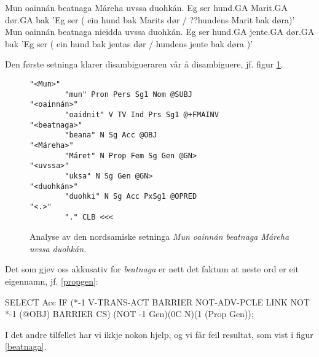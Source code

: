 \documentclass[a4paper,nynorsk]{article}
\begin{document}
\begin{example}\label{hund}
\gll Mun oainnán beatnaga Máreha uvssa duohkán.
 Eg ser hund.GA Marit.GA dør.GA bak
\glt 'Eg ser ( ein hund bak Marits dør / ??hundens Marit bak døra)'
\glend
\gll Mun oainnán beatnaga nieidda uvssa duohkán.
  Eg ser hund.GA jente.GA dør.GA bak
\glt 'Eg ser ( ein hund bak jentas dør / hundens jente bak døra )'
\glend
\end{example}

Den første setninga klarer disambigueraren vår å disambiguere, jf. figur \ref{Mareha}. %

\begin{figure}[htbp]
\begin{center}
\begin{verbatim}
"<Mun>"
        "mun" Pron Pers Sg1 Nom @SUBJ
"<oainnán>"
        "oaidnit" V TV Ind Prs Sg1 @+FMAINV
"<beatnaga>"
        "beana" N Sg Acc @OBJ
"<Máreha>"
        "Máret" N Prop Fem Sg Gen @GN>
"<uvssa>"
        "uksa" N Sg Gen @GN>
"<duohkán>"
        "duohki" N Sg Acc PxSg1 @OPRED
"<.>"
        "." CLB <<<
\end{verbatim}
\caption{Analyse av den nordsamiske setninga \textit{Mun oainnán beatnaga Máreha uvssa duohkán.}}
\label{Mareha}
\end{center}
\end{figure}


Det som gjev oss akkusativ for \textit{beatnaga} er nett det faktum at neste ord er eit eigennamn, jf. \ref{propgen}: %

\begin{example}\label{propgen}
SELECT Acc IF (*-1 V-TRANS-ACT BARRIER NOT-ADV-PCLE LINK NOT *-1 (@OBJ) BARRIER CS)
	(NOT -1 Gen)(0C N)(1 (Prop Gen));
\end{example}

I det andre tilfellet har vi ikkje nokon hjelp, og vi får feil resultat, som vist i figur \ref{beatnaga}. %
\end{document}
